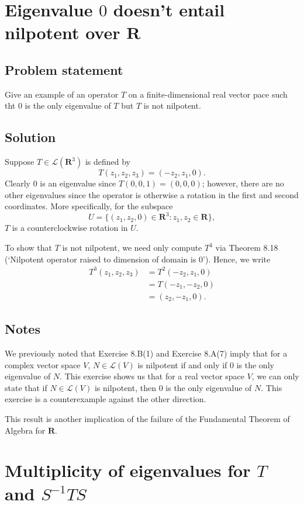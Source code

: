 \documentclass{article}
\begin{document}
\clearpage

\section{Eigenvalue $0$ doesn't entail nilpotent over $\mathbf{R}$}
\subsection*{Problem statement}
Give an example of an operator $T$ on a finite-dimensional real vector pace such tht $0$ is the only eigenvalue of $T$ but $T$ is not nilpotent.

\subsection*{Solution}
Suppose $T\in\mathcal{L}(\mathbf{R}^3)$ is defined by
\[T(z_1,z_2,z_3)=(-z_2,z_1,0).\]
Clearly $0$ is an eigenvalue since $T(0,0,1)=(0,0,0)$; however, there are no other eigenvalues since the operator is otherwise a rotation in the first and second coordinates. 
More specifically, for the subspace 
\[U=\{(z_1,z_2,0)\in\mathbf{R}^3:z_1,z_2\in\mathbf{R}\},\] 
$T$ is a counterclockwise rotation in $U$.

To show that $T$ is not nilpotent, we need only compute $T^3$ via Theorem 8.18 (`Nilpotent operator raised to dimension of domain is $0$'). 
Hence, we write
\begin{align*}
    T^3(z_1,z_2,z_3)&=T^2(-z_2,z_1,0)\\
    &=T(-z_1,-z_2,0)\\
    &=(z_2,-z_1,0).
\end{align*}

\subsection*{Notes}
We previously noted that Exercise 8.B(1) and Exercise 8.A(7) imply that for a complex vector space $V$, $N\in\mathcal{L}(V)$ is nilpotent if and only if $0$ is the only eigenvalue of $N$. 
This exercise shows us that for a real vector space $V$, we can only state that if $N\in\mathcal{L}(V)$ is nilpotent, then $0$ is the only eigenvalue of $N$. 
This exercise is a counterexample against the other direction.

This result is another implication of the failure of the Fundamental Theorem of Algebra for $\mathbf{R}$.

\clearpage

\section{Multiplicity of eigenvalues for $T$ and $S^{-1}TS$}
\end{document}
